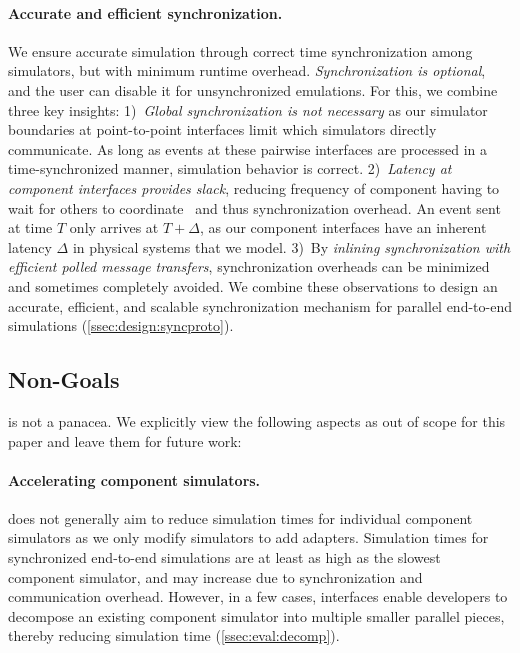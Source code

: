 \paragraph{Accurate and efficient synchronization.}
We ensure accurate simulation through correct time synchronization among
simulators, but with minimum runtime overhead.
%
\emph{Synchronization is optional}, and the user can disable it for
unsynchronized emulations.
%
For this, we combine three key insights:
%
1)~\emph{Global synchronization is not necessary} as our simulator
boundaries at point-to-point interfaces limit which simulators
directly communicate.
%
As long as events at these pairwise interfaces are processed in a
time-synchronized manner, simulation behavior is correct.
%
2)~\emph{Latency at component interfaces provides slack}, reducing
frequency of component having to wait for others to
coordinate~\cite{chen:slacksim} and thus synchronization overhead.
%
An event sent at time $T$ only arrives at $T+\Delta$, as our component
interfaces have an inherent latency $\Delta$ in physical systems that
we model.
%
3)~By \emph{inlining synchronization with efficient polled
message transfers}, synchronization overheads can be minimized and
sometimes completely avoided.
%
We combine these observations to design an accurate, efficient, and
scalable synchronization mechanism for parallel end-to-end simulations
(\autoref{ssec:design:syncproto}).



\subsection{Non-Goals}
\sysname is not a panacea. We explicitly view the following aspects as
out of scope for this paper and leave them for future work:

\paragraph{Accelerating component simulators.} \sysname does not
generally aim to reduce simulation times for individual component
simulators as we only modify simulators to add \sysname adapters.
%
Simulation times for synchronized end-to-end \sysname simulations are
at least as high as the slowest component simulator, and may increase
due to synchronization and communication overhead.
%
However, in a few cases, \sysname interfaces enable developers to
decompose an existing component simulator into multiple smaller
parallel pieces, thereby reducing simulation time
(\autoref{ssec:eval:decomp}).

